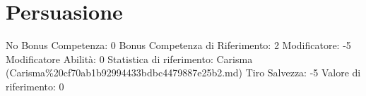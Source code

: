 \section{Persuasione}\label{persuasione}

\begin{description}
\tightlist
\item[Tags: ABI]
No Bonus Competenza: 0 Bonus Competenza di Riferimento: 2 Modificatore:
-5 Modificatore Abilità: 0 Statistica di riferimento: Carisma
(Carisma\%20cf70ab1b92994433bdbc4479887e25b2.md) Tiro Salvezza: -5
Valore di riferimento: 0
\end{description}
